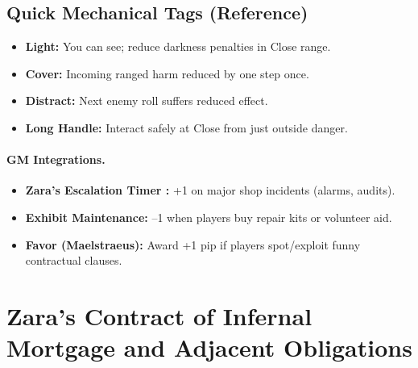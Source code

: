 \subsection{Quick Mechanical Tags (Reference)}
\begin{itemize}
  \item \textbf{Light:} You can see; reduce darkness penalties in Close range.
  \item \textbf{Cover:} Incoming ranged harm reduced by one step once.
  \item \textbf{Distract:} Next enemy roll suffers reduced effect.
  \item \textbf{Long Handle:} Interact safely at Close from just outside danger.
\end{itemize}

\paragraph{GM Integrations.}
\begin{itemize}
  \item \textbf{Zara's Escalation Timer :} +1 on major shop incidents (alarms, audits).
  \item \textbf{Exhibit Maintenance:} --1 when players buy repair kits or volunteer aid.
  \item \textbf{Favor (Maelstraeus):} Award +1 pip if players spot/exploit funny contractual clauses.
\end{itemize}

\section{Zara's Contract of Infernal Mortgage and Adjacent Obligations}
\label{sec:zara-contract}

